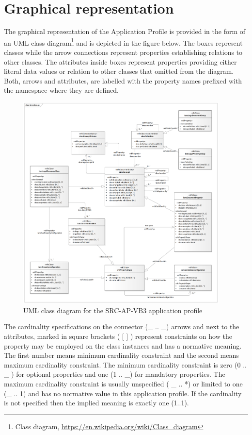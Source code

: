 
\section{Graphical representation}
\label{ariaid-title3}

The graphical representation of the Application Profile is provided in
the form of an UML class
diagram\footnote{Class diagram,
	\url{https://en.wikipedia.org/wiki/Class_diagram}} and is depicted
in the figure below. The boxes represent classes while the arrow
connections represent properties establishing relations to other
classes. The attributes inside boxes represent properties providing
either literal data values or relation to other classes that omitted
from the diagram. Both, arrows and attributes, are labelled with the
property names prefixed with the namespace where they are defined.

\begin{figure}[!ht]
	\centering
	\includegraphics[width=0.95\textwidth]{images/lam-skos-ap.png}
	\caption{UML class diagram for the SRC-AP-VB3 application profile}
\end{figure}

The cardinality specifications on the connector (\_ .. \_) arrows and
next to the attributes, marked in square brackets ( {[} {]} ) represent
constraints on how the property may be employed on the class instances
and has a normative meaning. The first number means minimum cardinality
constraint and the second means maximum cardinality constraint. The
minimum cardinality constraint is zero (0 .. \_ ) for optional
properties and one (1 .. \_) for mandatory properties. The maximum
cardinality constraint is usually unspecified ( \_ .. *) or limited to
one (\_ .. 1) and has no normative value in this application profile. If
the cardinality is not specified then the implied meaning is exactly one
(1..1).

